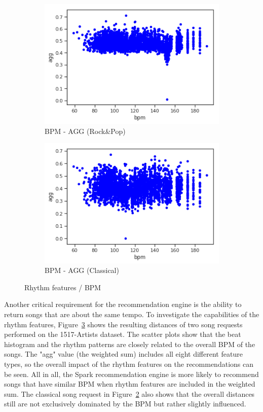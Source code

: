 \begin{figure}[htbp]
{{			\begin{subfigure}{.495\textwidth}
				\centering			
				\includegraphics[scale=0.5]{Images/SparkFeat/bpm_agg_hip.png}	
				\caption{BPM - AGG (Rock\&Pop)}
				\label{fig:arbpm}
			\end{subfigure}		
			\begin{subfigure}{.495\textwidth}
				\centering			
				\includegraphics[scale=0.5]{Images/SparkFeat/bpm_agg_clas.png}	
				\caption{BPM - AGG (Classical)}
				\label{fig:acbpm}
			\end{subfigure}%
	}}
	\caption{Rhythm features / BPM}
	\label{fig:rhythmfeat}
\end{figure}
\FloatBarrier

\noindent Another critical requirement for the recommendation engine is the ability to return songs that are about the same tempo. To investigate the capabilities of the rhythm features, Figure~\ref{fig:rhythmfeat} shows the resulting distances of two song requests performed on the 1517-Artists dataset.
\noindent The scatter plots show that the beat histogram and the rhythm patterns are closely related to the overall BPM of the songs. The "agg" value (the weighted sum) includes all eight different feature types, so the overall impact of the rhythm features on the recommendations can be seen. All in all, the Spark recommendation engine is more likely to recommend songs that have similar BPM when rhythm features are included in the weighted sum. The classical song request in Figure~\ref{fig:acbpm} also shows that the overall distances still are not exclusively dominated by the BPM but rather slightly influenced. 


